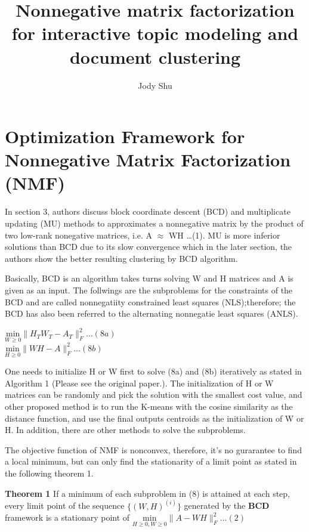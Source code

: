 \documentclass[11pt, oneside]{article}   	%
\title{Nonnegative matrix factorization for interactive topic modeling and document clustering}
\author{Jody Shu}
\begin{document}
\maketitle
\section{Optimization Framework for Nonnegative Matrix Factorization (NMF)}
\begin{Large}
In section 3, authors discuss block coordinate descent (BCD) and multiplicate updating (MU) methods to approximates a nonnegative matrix by the product of two low-rank nonegative matrices, i.e. A $\approx$ WH \ldots  (1).  MU is more inferior solutions than BCD due to its slow convergence which in the later section, the authors show the better resulting clustering by BCD algorithm.  

Basically, BCD is an algorithm takes turns solving W and H matrices and A is given as an input.  The follwings are the subproblems for the constraints of the BCD and are called nonnegatiity constrained least squares (NLS);therefore; the BCD has also been referred to the alternating nonnegatie least squares (ANLS).
\begin{center}
$\underset{W\geq0}{\mathrm{min}}\|H_{T}W_{T}-A_{T} \|^{\mathrm{2}}_{F} \ldots (8a)$\\
$\underset{H\geq0}{\mathrm{min}}\|WH-A\|^{\mathrm{2}}_{F}  \ldots (8b)$
\end{center}

One needs to initialize H or W first to solve (8a) and (8b) iteratively as stated in Algorithm 1 (Please see the original paper.).  The initialization of H or W matrices can be randomly and pick the solution with the smallest cost value, and other proposed method is to run the K-means with the cosine similarity as the distance function, and use the final outputs centroids as the initialization of W or H.  In addition, there are other methods to solve the subproblems.

The objective function of NMF is nonconvex, therefore, it's no gurarantee to find a local minimum, but can only find the stationarity of a limit point as stated in the following theorem 1.  

\textbf{Theorem 1}  If a minimum of each subproblem in (8) is attained at each step, every limit point of the sequence $\{(W,H)^{(i)}\}$ generated by the \textbf{BCD} framework is a stationary point of $\underset{H\geq0, W\geq0}{\mathrm{min}}\|A-WH\|^{\mathrm{2}}_{F}  \ldots (2)$


\end{Large}
\end{document}
